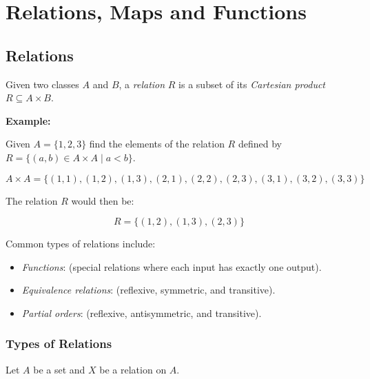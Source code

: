 \chapter{Relations, Maps and Functions}

\section{Relations}

Given two classes \(A\) and \(B\), a \emph{relation} \(R\) is a subset of its \emph{Cartesian product} \(R \subseteq A \times B\). 

\textbf{Example:} 

Given \(A = \{1,2,3\}\) find the elements of the relation \(R\) defined by \(R = \{(a, b) \in A \times A \mid a < b\}\).

\[
	A \times A = \{(1,1), (1,2), (1,3), (2,1), (2,2), (2,3), (3,1), (3,2), (3,3)\}
\]

The relation \(R\) would then be:

\[
	R = \{(1,2), (1,3), (2,3)\}
\]

Common types of relations include:

\begin{itemize}

	\item \emph{Functions}: (special relations where each input has exactly one output).

	\item \emph{Equivalence relations}: (reflexive, symmetric, and transitive).

	\item \emph{Partial orders}: (reflexive, antisymmetric, and transitive).

\end{itemize}

\subsection{Types of Relations}

Let \(A\) be a set and \(X\) be a relation on \(A\).

